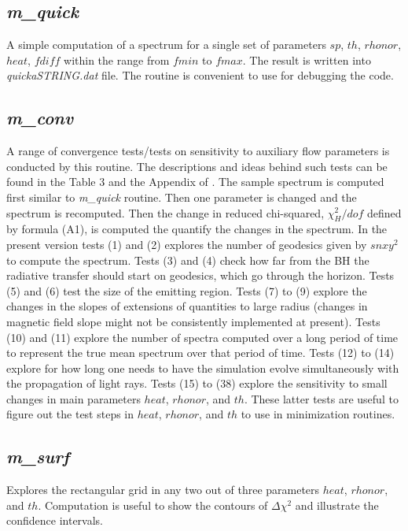 \documentclass{emulateapj}
\begin{document}
\subsection{\textit{m\_quick}}
A simple computation of a spectrum for a single set of parameters $sp$, $th$, $rhonor$, $heat$, $fdiff$ within the range from
$fmin$ to $fmax$. The result is written into \textit{quickaSTRING.dat} file.
The routine is convenient to use for debugging the code.

\subsection{\textit{m\_conv}}
A range of convergence tests/tests on sensitivity to auxiliary flow parameters is conducted by this routine.
The descriptions and ideas behind such tests can be found in the Table 3 and the Appendix of \citet{Shcherbakov:2012appl}.
The sample spectrum is computed first similar to \textit{m\_quick} routine. Then one parameter is changed and the spectrum is recomputed.
Then the change in reduced chi-squared, $\chi^2_H/dof$ defined by formula (A1), is computed the quantify the changes in the spectrum.
In the present version tests (1) and (2) explores the number of geodesics given by $snxy^2$ to compute the spectrum.
Tests (3) and (4) check how far from the BH the radiative transfer should start on geodesics, which go through the horizon.
Tests (5) and (6) test the size of the emitting region.
Tests (7) to (9) explore the changes in the slopes of extensions of quantities to large radius (changes in magnetic field slope
might not be consistently implemented at present).
Tests (10) and (11) explore the number of spectra computed over a long period of time to represent the true mean spectrum 
over that period of time.
Tests (12) to (14) explore for how long one needs to have the simulation evolve simultaneously with the propagation of light rays.
Tests (15) to (38) explore the sensitivity to small changes in main parameters $heat$, $rhonor$, and $th$.
These latter tests are useful to figure out the test steps in $heat$, $rhonor$, and $th$ 
to use in minimization routines.

\subsection{\textit{m\_surf}}
Explores the rectangular grid in any two out of three parameters $heat$, $rhonor$, and $th$.
Computation is useful to show the contours of $\Delta\chi^2$ and illustrate the confidence intervals.
\end{document}
